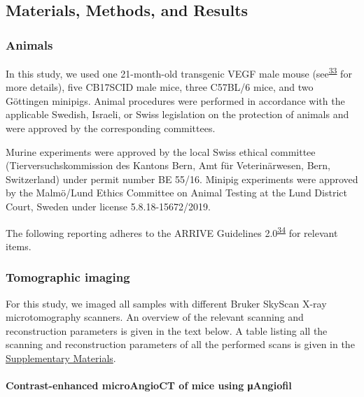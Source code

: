 \hypertarget{materials-methods-and-results}{%
\subsection{Materials, Methods, and Results}\label{materials-methods-and-results}}

\hypertarget{animals}{%
\subsubsection{Animals}\label{animals}}

In this study, we used one 21-month-old transgenic VEGF male mouse (see\textsuperscript{\protect\hyperlink{ref-nC0ZZVgL}{33}} for more details), five CB17SCID male mice, three C57BL/6 mice, and two Göttingen minipigs.
Animal procedures were performed in accordance with the applicable Swedish, Israeli, or Swiss legislation on the protection of animals and were approved by the corresponding committees.

Murine experiments were approved by the local Swiss ethical committee (Tierversuchskommission des Kantons Bern, Amt für Veterinärwesen, Bern, Switzerland) under permit number BE 55/16.
Minipig experiments were approved by the Malmö/Lund Ethics Committee on Animal Testing at the Lund District Court, Sweden under license 5.8.18-15672/2019.

The following reporting adheres to the ARRIVE Guidelines 2.0\textsuperscript{\protect\hyperlink{ref-1ppOkyPO}{34}} for relevant items.

\hypertarget{tomographic-imaging}{%
\subsubsection{Tomographic imaging}\label{tomographic-imaging}}

For this study, we imaged all samples with different Bruker SkyScan X-ray microtomography scanners.
An overview of the relevant scanning and reconstruction parameters is given in the text below.
A table listing all the scanning and reconstruction parameters of all the performed scans is given in the \protect\hyperlink{supplementary-materials}{Supplementary Materials}.

\hypertarget{contrast-enhanced-microangioct-of-mice-using-ux3bcangiofil}{%
\paragraph{Contrast-enhanced microAngioCT of mice using μAngiofil}\label{contrast-enhanced-microangioct-of-mice-using-ux3bcangiofil}}

